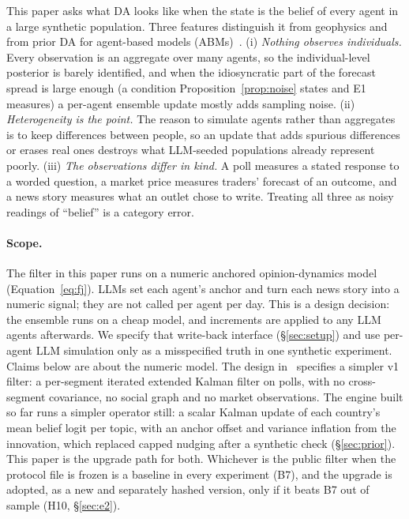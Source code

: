 \documentclass[10pt]{article}
\theoremstyle{remark}
\begin{document}
This paper asks what DA looks like when the state is the belief of every agent in a large synthetic population. Three features distinguish it from geophysics and from prior DA for agent-based models (ABMs)~\cite{ward2016,kieu2020,malleson2020,makinoshima2022,oswald2024,suchak2024}. (i) \emph{Nothing observes individuals.} Every observation is an aggregate over many agents, so the individual-level posterior is barely identified, and when the idiosyncratic part of the forecast spread is large enough (a condition Proposition~\ref{prop:noise} states and E1 measures) a per-agent ensemble update mostly adds sampling noise. (ii) \emph{Heterogeneity is the point.} The reason to simulate agents rather than aggregates is to keep differences between people, so an update that adds spurious differences or erases real ones destroys what LLM-seeded populations already represent poorly. (iii) \emph{The observations differ in kind.} A poll measures a stated response to a worded question, a market price measures traders' forecast of an outcome, and a news story measures what an outlet chose to write. Treating all three as noisy readings of ``belief'' is a category error.

\paragraph{Scope.} The filter in this paper runs on a numeric anchored opinion-dynamics model (Equation~\eqref{eq:fj}). LLMs set each agent's anchor and turn each news story into a numeric signal; they are not called per agent per day. This is a design decision: the ensemble runs on a cheap model, and increments are applied to any LLM agents afterwards. We specify that write-back interface (\S\ref{sec:setup}) and use per-agent LLM simulation only as a misspecified truth in one synthetic experiment. Claims below are about the numeric model. The design in~\cite{rw_askaworld} specifies a simpler v1 filter: a per-segment iterated extended Kalman filter on polls, with no cross-segment covariance, no social graph and no market observations. The engine built so far runs a simpler operator still: a scalar Kalman update of each country's mean belief logit per topic, with an anchor offset and variance inflation from the innovation, which replaced capped nudging after a synthetic check (\S\ref{sec:prior}). This paper is the upgrade path for both. Whichever is the public filter when the protocol file is frozen is a baseline in every experiment (B7), and the upgrade is adopted, as a new and separately hashed version, only if it beats B7 out of sample (H10, \S\ref{sec:e2}).
\end{document}
